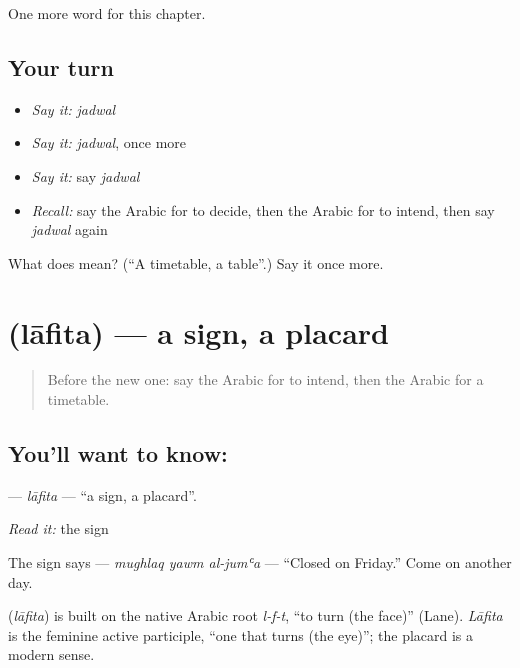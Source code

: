 \begin{grammarlens}[title={What you've built}]
One more word for this chapter.
\end{grammarlens}

\subsection*{Your turn}
\begin{itemize}
\raggedright
  \item \emph{Say it:} \emph{jadwal}
  \item \emph{Say it:} \emph{jadwal}, once more
  \item \emph{Say it:} say \emph{jadwal}
  \item \emph{Recall:} say the Arabic for to decide, then the Arabic for to intend, then say \emph{jadwal} again
\end{itemize}

\begin{tcolorbox}[breakable,colback=teal!4,colframe=teal!35!black,title={Before you move on}]
What does  mean? (\textquotedblleft{}A timetable, a table\textquotedblright{}.) Say it once more.
\end{tcolorbox}
\section[\texorpdfstring{\ar{لافتة} (lāfita)}{لافتة (lāfita)}]{ (lāfita) — a sign, a placard}

\label{lesson:AR-C158-lafita}



\begin{quote}
Before the new one: say the Arabic for to intend, then the Arabic for a timetable.
\end{quote}

\subsection*{You'll want to know: }
\textbf{} — \emph{lāfita} — \textquotedblleft{}a sign, a placard\textquotedblright{}.

\emph{Read it:} the sign

The sign says \textbf{  } — \emph{mughlaq yawm al-jumʿa} — \textquotedblleft{}Closed on Friday.\textquotedblright{} Come on another day.

\begin{cousinweb}
\textbf{} (\emph{lāfita}) is built on the native Arabic root \emph{l-f-t}, \textquotedblleft{}to turn (the face)\textquotedblright{} (Lane). \emph{Lāfita} is the feminine active participle, \textquotedblleft{}one that turns (the eye)\textquotedblright{}; the placard is a modern sense.
\end{cousinweb}

